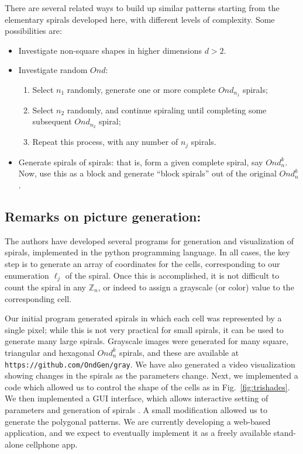 \documentclass{article}
\theoremstyle{definition}
\def\ZZ{\mathbb{Z}}
\begin{document}
There are several related ways to build up similar patterns starting
from the elementary spirals developed here, with different levels of
complexity.  Some possibilities are:
\begin{itemize}
\item Investigate non-square shapes in higher dimensions $d > 2$.
\item Investigate random $Ond$:
\begin{enumerate}
\item Select $n_1$ randomly, generate one or more complete $Ond_{n_1}$
  spirals; 
\item Select $n_2$ randomly, and continue spiraling until completing
  some subsequent $Ond_{n_2}$ spiral;
\item Repeat this process, with any number of $n_j$ spirals.
\end{enumerate}
\item Generate spirals of spirals: that is, form a given complete
  spiral, say $Ond_n^k$.  Now, use this as a block and generate
  ``block spirals'' out of the original $Ond_n^k$.
\end{itemize}

\subsection*{Remarks on picture generation:}

The authors have developed several programs for generation and
visualization of spirals, implemented in the python programming
language.  In all cases, the key step is to generate an array of
coordinates for the cells, corresponding to our enumeration $\ell_j$
of the spiral.  Once this is accomplished, it is not difficult to
count the spiral in any $\ZZ_n$, or indeed to assign a grayscale (or
color) value to the corresponding cell.

Our initial program generated spirals in which each cell was
represented by a single pixel; while this is not very practical for
small spirals, it can be used to generate many large spirals.
Grayscale images were generated for many square, triangular and
hexagonal $Ond_n^k$ spirals, and these are available at {\tt
 https://github.com/OndGen/gray}.  We have also generated a video visualization
showing changes in the spirals as the parameters change.  Next, we
implemented a code which allowed us to control the shape of the cells
as in Fig.~\ref{fig:trishades}.  We then implemented a GUI interface,
which allows interactive setting of parameters and generation of
spirals \cite{spyrrals}.  A small modification allowed us to generate the polygonal
patterns.  We are currently developing a web-based application, and we
expect to eventually implement it as a freely available stand-alone
cellphone app.
\end{document}
